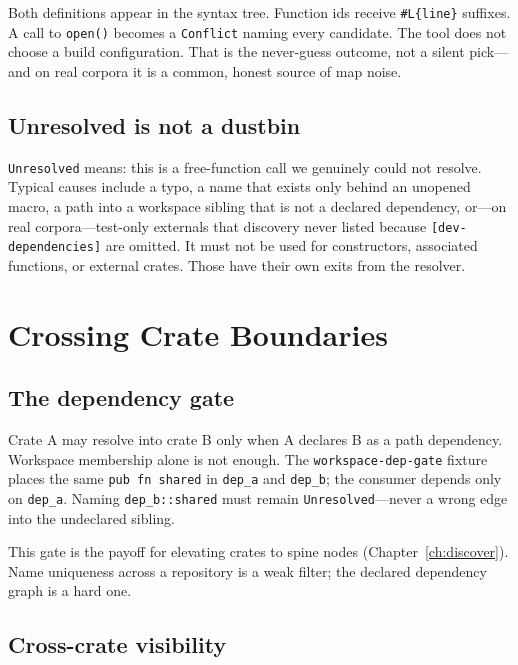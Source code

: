 \documentclass[11pt,a4paper,oneside]{report}
\begin{document}
Both definitions appear in the syntax tree. Function ids receive
\texttt{\#L\{line\}} suffixes. A call to \texttt{open()} becomes a
\texttt{Conflict} naming every candidate. The tool does not choose a build
configuration. That is the never-guess outcome, not a silent pick---and on
real corpora it is a common, honest source of map noise.

\section{Unresolved is not a dustbin}

\texttt{Unresolved} means: this is a free-function call we genuinely could
not resolve. Typical causes include a typo, a name that exists only behind an
unopened macro, a path into a workspace sibling that is not a declared
dependency, or---on real corpora---test-only externals that discovery never
listed because \texttt{[dev-dependencies]} are omitted. It must not be used
for constructors, associated functions, or external crates. Those have their
own exits from the resolver.

\chapter{Crossing Crate Boundaries}
\label{ch:cross-crate}

\section{The dependency gate}

Crate A may resolve into crate B only when A declares B as a path dependency.
Workspace membership alone is not enough. The
\texttt{workspace-dep-gate} fixture places the same \texttt{pub fn shared} in
\texttt{dep\_a} and \texttt{dep\_b}; the consumer depends only on
\texttt{dep\_a}. Naming \texttt{dep\_b::shared} must remain
\texttt{Unresolved}---never a wrong edge into the undeclared sibling.

This gate is the payoff for elevating crates to spine nodes
(Chapter~\ref{ch:discover}). Name uniqueness across a repository is a weak
filter; the declared dependency graph is a hard one.

\section{Cross-crate visibility}
\end{document}
